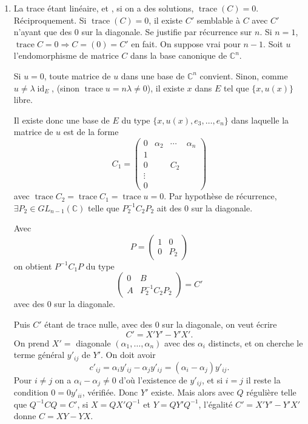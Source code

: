 \begin{enumerate}[label=\arabic*.,leftmargin=2.2em,itemsep=1.2em]
\item La trace étant linéaire, et , si on a des solutions, $\operatorname{trace}(C)=0$. Réciproquement. Si $\operatorname{trace}(C)=0$, il existe $C'$ semblable à $C$ avec $C'$ n'ayant que des 0 sur la diagonale. Se justifie par récurrence sur $n$. Si $n=1$, $\operatorname{trace}C=0\Rightarrow C=(0)=C'$ en fait. On suppose vrai pour $n-1$. Soit $u$ l'endomorphisme de matrice $C$ dans la base canonique de $\mathbb C^n$.

Si $u=0$, toute matrice de $u$ dans une base de $\mathbb C^n$ convient. Sinon, comme $u\ne\lambda\operatorname{id}_E$, (sinon $\operatorname{trace}u=n\lambda\ne0$), il existe $x$ dans $E$ tel que $\{x,u(x)\}$ libre.

Il existe donc une base de $E$ du type $\{x,u(x),e_3,\ldots,e_n\}$ dans laquelle la matrice de $u$ est de la forme
\[
C_1=\begin{pmatrix}
0&\alpha_2&\cdots&\alpha_n\\
1&&&\\
0&&C_2&\\
\vdots&&&\\
0&&&
\end{pmatrix}
\]
avec $\operatorname{trace}C_2=\operatorname{trace}C_1=\operatorname{trace}u=0$. Par hypothèse de récurrence, $\exists P_2\in GL_{n-1}(\mathbb C)$ telle que $P_2^{-1}C_2P_2$ ait des 0 sur la diagonale.

Avec
\[
P=\begin{pmatrix}1&0\\0&P_2\end{pmatrix}
\]
on obtient $P^{-1}C_1P$ du type
\[
\begin{pmatrix}0&B\\A&P_2^{-1}C_2P_2\end{pmatrix}=C'
\]
avec des 0 sur la diagonale.

Puis $C'$ étant de trace nulle, avec des 0 sur la diagonale, on veut écrire
\[
C'=X'Y'-Y'X'.
\]
On prend $X'=$ diagonale $(\alpha_1,\ldots,\alpha_n)$ avec des $\alpha_i$ distincts, et on cherche le terme général $y'_{ij}$ de $Y'$. On doit avoir
\[
c'_{ij}=\alpha_i y'_{ij}-\alpha_jy'_{ij}=(\alpha_i-\alpha_j)y'_{ij}.
\]
Pour $i\ne j$ on a $\alpha_i-\alpha_j\ne0$ d'où l'existence de $y'_{ij}$, et si $i=j$ il reste la condition $0=0y'_{ii}$, vérifiée. Donc $Y'$ existe. Mais alors avec $Q$ régulière telle que $Q^{-1}CQ=C'$, si $X=QX'Q^{-1}$ et $Y=QY'Q^{-1}$, l'égalité $C'=X'Y'-Y'X'$ donne $C=XY-YX$.


\end{enumerate}
